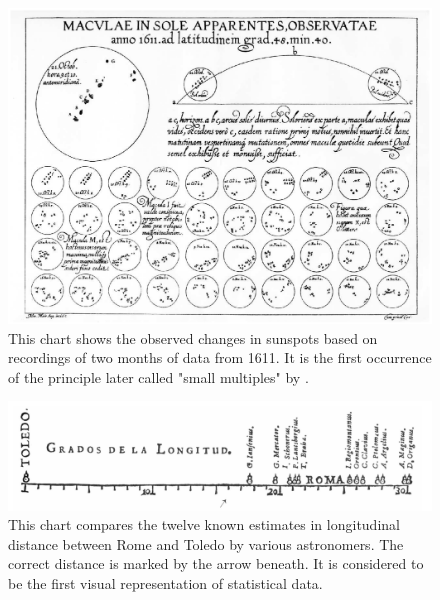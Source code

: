 \begin{figure}[tp]
    \centering
    \includegraphics[keepaspectratio,width=\linewidth,height=\fullh / 3]
    {images/sunspot-changes.png}
    \caption[Chart of Changes in Sunspots from 1626]{
        This chart shows the observed changes in sunspots based on recordings of two months of data from 1611. It is the first occurrence of the principle later called "small multiples" by \cite{VisualDisplayOfQuantitativeInformation}. 
    }
    \label{fig:SunspotChanges}
\end{figure}

\begin{figure}[tp]
    \centering
    \includegraphics[keepaspectratio,width=\linewidth,height=\fullh / 3]
    {images/rome-toledo-longitude.png}
    \caption[Chart of Longitudinal Distance Determinations Between Toledo and Rome From 1644]{
        This chart compares the twelve known estimates in longitudinal distance between Rome and Toledo by various astronomers. The correct distance is marked by the arrow beneath. It is considered to be the first visual representation of statistical data. 
    }
    \label{fig:RomeToledoLongitude}
\end{figure}

